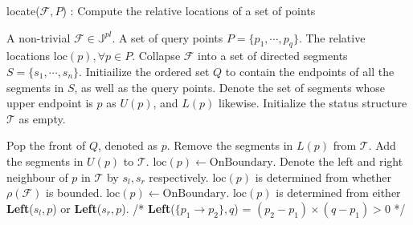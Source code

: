 \documentclass[a4paper]{article}
\newcommand{\bJpl}{\mathbb{J}^{pl}}
\newcommand{\cF}{\mathcal{F}}
\newcommand{\loc}[1]{\text{loc}(#1)}
\begin{document}
\begin{algorithm}[htbp]
  \caption{locate($\cF,P$) : Compute the relative locations of a set of points}
  \label{alg:locate}
  \begin{algorithmic}[1]
    \renewcommand{\algorithmicrequire}{\textbf{Input : }}
    \REQUIRE A non-trivial $\cF \in \bJpl$.
    A set of query points $P = \{p_1,\cdots,p_q\}$.
    \renewcommand{\algorithmicensure}{\textbf{Output : }}
    \ENSURE The relative locations $\loc{p}, \forall p \in P$.
    \STATE Collapse $\cF$ into a set of directed segments $S = \{s_1,\cdots,s_n\}$. 
    \STATE Initiailize the ordered set $Q$
    to contain the endpoints of all the segments in $S$,
    as well as the query points. 
    \STATE Denote the set of segments whose upper endpoint is $p$ as $U(p)$, 
    and $L(p)$ likewise. 
    \STATE Initialize the status structure $\mathcal{T}$ as empty. 
    \STATE
    
    \STATE Pop the front of $Q$, denoted as $p$. 
    \STATE Remove the segments in $L(p)$ from $\mathcal{T}$. 
    \STATE Add the segments in $U(p)$ to $\mathcal{T}$. 
    \STATE $\loc{p} \leftarrow \text{OnBoundary}$. 
    \ENDIF
    \ELSE
    \STATE Denote the left and right neighbour of $p$
    in $\mathcal{T}$ by $s_l,s_r$ respectively. 
    \STATE $\loc{p}$ is determined from whether $\rho(\cF)$ is bounded. 
    \STATE $\loc{p} \leftarrow \text{OnBoundary}$. 
    \ELSE
    \STATE $\loc{p}$ is determined from either
    \textbf{Left}($s_l,p$) or \textbf{Left}($s_r,p$). 
    \STATE /* \textbf{Left}($\{p_1 \rightarrow p_2\},q$) = $(p_2-p_1) \times (q-p_1) > 0$ */
    \ENDIF
    \ENDIF

    \ENDWHILE
  \end{algorithmic}
\end{algorithm}
\end{document}
